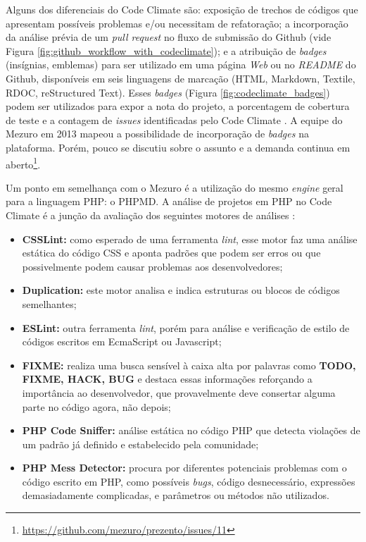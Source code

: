 \newpage

Alguns dos diferenciais do Code Climate são: exposição de trechos de códigos que
apresentam possíveis problemas e/ou necessitam de refatoração; a incorporação da
análise prévia de um \textit{pull request} no fluxo de submissão do Github (vide
Figura \ref{fig:github_workflow_with_codeclimate}); e a
atribuição de \textit{badges} (insígnias, emblemas) para ser utilizado em uma
página \textit{Web} ou no \textit{README} do Github, disponíveis em seis
linguagens de marcação (HTML, Markdown, Textile, RDOC, reStructured Text).
Esses \textit{badges} (Figura \ref{fig:codeclimate_badges}) podem ser utilizados
para expor a nota do projeto, a porcentagem de cobertura de teste e a contagem
de \textit{issues} identificadas pelo Code Climate \cite{codeClimateDoc}. A
equipe do Mezuro em 2013 mapeou a possibilidade de incorporação de \textit{badges}
na plataforma. Porém, pouco se discutiu sobre o assunto e a demanda continua em
aberto\footnote{\url{https://github.com/mezuro/prezento/issues/11}}.

Um ponto em semelhança com o Mezuro é a utilização do mesmo \textit{engine}
geral para a linguagem PHP: o PHPMD. A análise de projetos em PHP no Code Climate
é a junção da avaliação dos seguintes motores de análises \cite{codeClimateDoc}:

\begin{itemize}
  \item \textbf{CSSLint:} como esperado de uma ferramenta \textit{lint}, esse
	motor faz uma análise estática do código CSS e aponta padrões que podem ser
	erros ou que possivelmente podem causar problemas aos desenvolvedores;
	\item \textbf{Duplication:} este motor analisa e indica estruturas ou blocos
	de códigos semelhantes;
	\item \textbf{ESLint:} outra ferramenta \textit{lint}, porém para análise e
	verificação de estilo de códigos escritos em EcmaScript ou Javascript;
	\item \textbf{FIXME:} realiza uma busca sensível à caixa alta por palavras
	como \textbf{TODO, FIXME, HACK, BUG} e destaca essas informações reforçando a
	importância ao desenvolvedor, que provavelmente deve consertar alguma parte no
	código agora, não depois;
	\item \textbf{PHP Code Sniffer:} análise estática no código PHP que detecta
	violações de um padrão já definido e estabelecido pela comunidade;
	\item \textbf{PHP Mess Detector:} procura por diferentes potenciais problemas
	com o código escrito em PHP, como possíveis \textit{bugs}, código desnecessário,
	expressões demasiadamente complicadas, e parâmetros ou métodos não utilizados.
\end{itemize}

